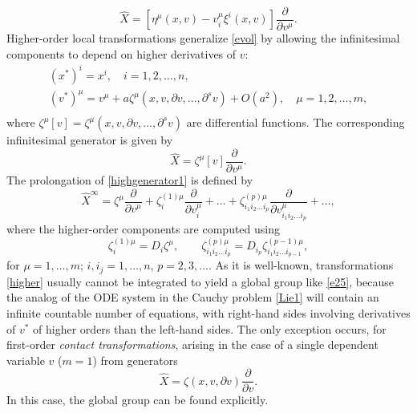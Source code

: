 \documentclass[11pt,letter,subeqn]{article}
\begin{document}
\begin{equation}\label{evolg}
\hat{X}=[{\eta}^\mu(x,v)-v_i^\mu \xi^i(x,v)]\frac{\partial}{\partial v^\mu}.
\end{equation}
Higher-order local transformations generalize \eqref{evol} by allowing the infinitesimal components to depend on higher derivatives of $v$:
\begin{equation}\label{higher}
\begin{array}{l}
  (x^*)^i  =x^i ,\quad i = 1,2, \ldots ,n, \\
  (v^*)^\mu  = v^\mu +a \zeta^\mu(x,v,\partial v,...,\partial^{s} v)+ O(a^2),\quad \mu = 1,2, \ldots ,m, \\
 \end{array}
\end{equation}
where $\zeta^\mu[v] = \zeta^\mu(x,v,\partial v,...,\partial^{s} v)$ are differential functions. The corresponding infinitesimal generator is given by
\begin{equation}\label{highgenerator1}
   \hat{X}=\zeta^\mu[v]\dfrac{\partial}{\partial v^\mu}.
\end{equation}
The prolongation of \eqref{highgenerator1} is defined by
\begin{equation}\label{highprolong}
   \hat{X}^\infty=\zeta^\mu\dfrac{\partial}{\partial v^\mu}+\zeta_{i}^{(1)\mu} \dfrac{\partial }{{\partial v_i^\mu }}
+\ldots + \zeta_{i_1 i_2  \ldots i_p }^{(p)\mu} \dfrac{\partial
}{{\partial v_{i_1 i_2  \ldots i_p }^\mu }} +  \ldots ,
 \end{equation}
where the higher-order components are computed using
\begin{equation}\label{ho:symm:comp}
   \zeta_{i}^{(1)\mu} = D_i\zeta^\mu, \qquad
   \zeta_{i_1 i_2  \ldots i_p }^{(p)\mu} =D_{i_p}\zeta_{i_1 i_2  \ldots i_{p-1} }^{(p-1)\mu},
 \end{equation}
for $\mu=1,\ldots,m$; $i,i_j=1,\ldots,n$, $p=2,3,\ldots$. As it is well-known, transformations \eqref{higher} usually cannot be integrated to yield a global group like \eqref{e25}, because the analog of the ODE system in the Cauchy problem \eqref{Lie1} will contain an infinite countable number of equations, with right-hand sides involving derivatives of $v^*$ of higher orders than the left-hand sides. The only exception occurs, for first-order \emph{contact transformations}, arising in the case of a single dependent variable $v$ ($m=1$) from
generators
\begin{equation}\label{contactX}
  \hat{X}=\zeta(x,v,\partial v)\dfrac{\partial}{\partial v}.
\end{equation}
In this case, the global group can be found explicitly.
\end{document}
